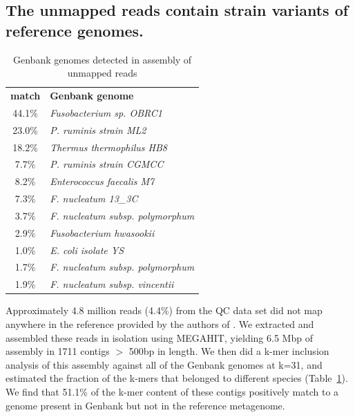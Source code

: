 \documentclass[11pt]{article}
\begin{document}

\subsection*{The unmapped reads contain strain variants of reference genomes.}





\begin{table}[t]
\caption{Genbank genomes detected in assembly of unmapped reads}
\centering
\begin{tabular}{|c|l|}
\hline

\textbf{match}& \textbf{Genbank genome} \\ [0.5ex] %
44.1\% & {\em \small Fusobacterium sp. OBRC1 } \\
\hline
23.0\% & {\em \small P. ruminis strain ML2 } \\
\hline
18.2\% & {\em \small Thermus thermophilus HB8 } \\
\hline
7.7\% & {\em \small P. ruminis strain CGMCC } \\
\hline
8.2\% & {\em \small Enterococcus faecalis M7 } \\
\hline
7.3\% & {\em \small F. nucleatum 13\_3C } \\
\hline
3.7\% & {\em \small F. nucleatum subsp. polymorphum } \\
\hline
2.9\% & {\em \small Fusobacterium hwasookii } \\
\hline
1.0\% & {\em \small E. coli isolate YS } \\
\hline
1.7\% & {\em \small F. nucleatum subsp. polymorphum } \\
\hline
1.9\% & {\em \small F. nucleatum subsp. vincentii } \\
\hline

\end{tabular}
\label{table:gather}
\end{table}

Approximately 4.8 million reads (4.4\%) from the QC data set did not
map anywhere in the reference provided by the authors of \cite{podar}.
We extracted and assembled these reads in isolation using MEGAHIT,
yielding 6.5 Mbp of assembly in 1711 contigs $>$ 500bp in length.  We
then did a k-mer inclusion analysis of this assembly against all of
the Genbank genomes at k=31, and estimated the fraction of the k-mers
that belonged to different species (Table~\ref{table:gather}). We find
that 51.1\% of the k-mer content of these contigs positively match to
a genome present in Genbank but not in the reference metagenome.
\end{document}
